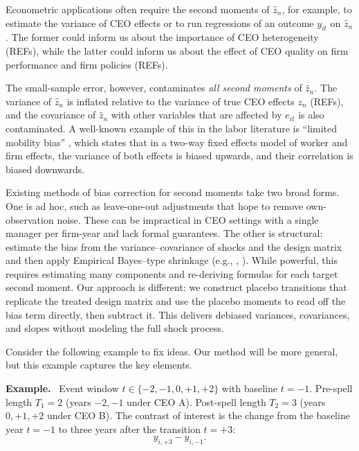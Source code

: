 \documentclass[11pt,a4paper]{article}
\begin{document}
Econometric applications often require the second moments of $\hat z_n$, for example, to estimate the variance of CEO effects or to run regressions of an outcome $y_{it}$ on $\hat z_n$. The former could inform us about the importance of CEO heterogeneity (REFs), while the latter could inform us about the effect of CEO quality on firm performance and firm policies (REFs). 

The small-sample error, however, contaminates \emph{all second moments} of $\hat z_n$. The variance of $\hat z_n$ is inflated relative to the variance of true CEO effects $z_n$ (REFs), and the covariance of $\hat z_n$ with other variables that are affected by $e_{it}$ is also contaminated. A well-known example of this in the labor literature is ``limited mobility bias'' \citep{andrews2008high}, which states that in a two-way fixed effects model of worker and firm effects, the variance of both effects is biased upwards, and their correlation is biased downwards.

Existing methods of bias correction for second moments take two broad forms. One is ad hoc, such as leave-one-out adjustments that hope to remove own-observation noise. These can be impractical in CEO settings with a single manager per firm-year and lack formal guarantees. The other is structural: estimate the bias from the variance–covariance of shocks and the design matrix and then apply Empirical Bayes–type shrinkage (e.g., \citealt{andrews2008high}, \citealt{Bonhomme2023-dx}). While powerful, this requires estimating many components and re-deriving formulas for each target second moment. Our approach is different: we construct placebo transitions that replicate the treated design matrix and use the placebo moments to read off the bias term directly, then subtract it. This delivers debiased variances, covariances, and slopes without modeling the full shock process.


\newenvironment{example}{\par\noindent\textbf{Example.}\ }{\par}

Consider the following example to fix ideas. Our method will be more general, but this example captures the key elements.
\begin{example}
Event window $t\in\{-2,-1,0,+1,+2\}$ with baseline $t=-1$. Pre-spell length $T_1=2$ (years $-2,-1$ under CEO A). Post-spell length $T_2=3$ (years $0, +1,+2$ under CEO B). The contrast of interest is the change from the baseline year $t=-1$ to three years after the transition $t=+3$:
\[
y_{i,+3} - y_{i,-1}.
\]
\end{example}
\end{document}
